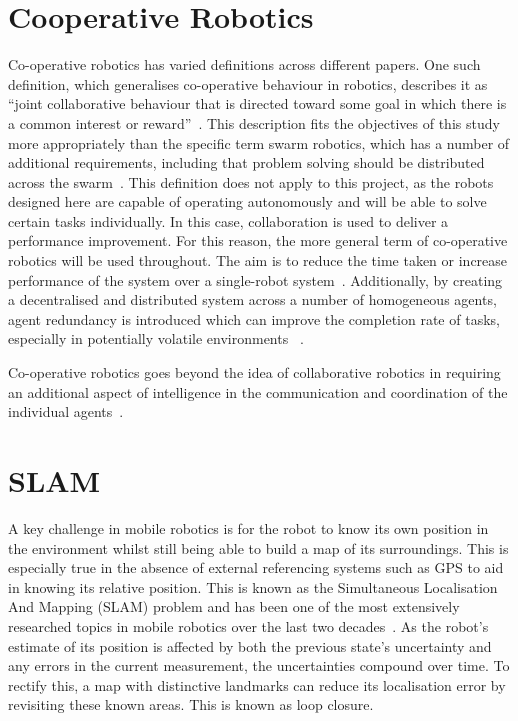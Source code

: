 \section{Cooperative Robotics}\label{litreview/coop}
Co-operative robotics has varied definitions across different papers. One such
definition, which generalises co-operative behaviour in robotics, describes it as ``joint
collaborative behaviour that is directed toward some goal in which there is a
common interest or reward''~\cite{barnes1991behaviour}. This description fits the
objectives of this study more appropriately than the specific term swarm robotics, 
which has a number of additional requirements, including
that problem solving should be distributed across the swarm~\cite{sahin04}.
This definition does not apply to this project, as the robots designed
here are capable of operating autonomously and will be able to solve certain tasks
individually. In this case, collaboration is used to deliver a performance 
improvement. For this reason, the more general term of co-operative robotics will
be used throughout. The aim is to reduce the time taken or increase performance 
of the system over a single-robot system~\cite{premvuti1990consideration}. 
Additionally, by creating a decentralised and distributed system across a number 
of homogeneous agents, agent redundancy is introduced which can improve the 
completion rate of tasks, especially in potentially volatile environments~
\cite{beckers1994local, parker95}.

Co-operative robotics goes beyond the idea
of collaborative robotics in requiring an additional aspect of intelligence in
the communication and coordination of the individual agents~\cite{cao1995cooperative}.

\section{SLAM}\label{litreview/slam}
A key challenge in mobile robotics is for the robot to know its own position in the
environment whilst still being able to build a map of its surroundings. 
This is especially true in the absence of external referencing systems
such as GPS to aid in knowing its relative position. This is known as the Simultaneous Localisation And Mapping (SLAM)
problem and has been one of the most extensively researched topics in mobile
robotics over the last two decades~\cite{grisetti2010tutorial}. As the robot's
estimate of its position is affected by both the previous state's uncertainty
and any errors in the current measurement, the uncertainties compound
over time. To rectify this, a map with distinctive landmarks can reduce its
localisation error by revisiting these known areas. This is known as loop closure.

